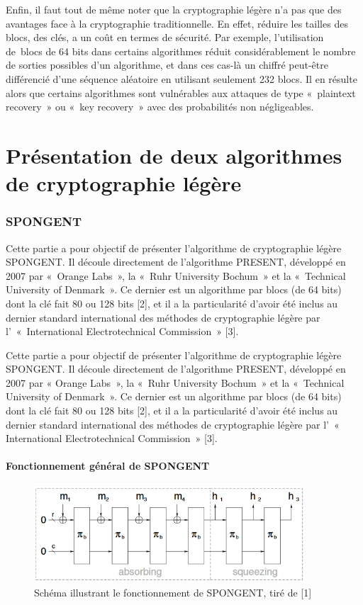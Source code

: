 	Enfin, il faut tout de même noter que la cryptographie légère n’a pas que des
	avantages face à la cryptographie traditionnelle. En effet, réduire les
	tailles des blocs, des clés, a un coût en termes de sécurité. Par exemple,
	l’utilisation de blocs de 64 bits dans certains algorithmes réduit
	considérablement le nombre de sorties possibles d’un algorithme, et dans ces
	cas-là un chiffré peut-être différencié d’une séquence aléatoire en utilisant
	seulement 232 blocs. Il en résulte alors que certains algorithmes sont
	vulnérables aux attaques de type « plaintext recovery » ou « key recovery »
	avec des probabilités non négligeables.


\part{Présentation de deux algorithmes de cryptographie légère}

	\section{SPONGENT}

			Cette partie a pour objectif de présenter l’algorithme de cryptographie légère SPONGENT.
		Il découle directement de l’algorithme PRESENT, développé en 2007 par « Orange Labs », la « Ruhr University Bochum » et la « Technical  University of Denmark ».
		Ce dernier est un algorithme par blocs (de 64 bits) dont la clé fait 80 ou 128 bits [2],
		et il a la particularité d’avoir été inclus au dernier standard international des méthodes de cryptographie légère par l’ « International Electrotechnical Commission » [3].

			Cette partie a pour objectif de présenter l’algorithme de cryptographie légère
		SPONGENT. Il découle directement de l’algorithme PRESENT, développé en 2007 par «
		Orange Labs », la « Ruhr University Bochum » et la « Technical  University of
		Denmark ». Ce dernier est un algorithme par blocs (de 64 bits) dont la clé fait
		80 ou 128 bits [2], et il a la particularité d’avoir été inclus au dernier
		standard international des méthodes de cryptographie légère par l’ «
		International Electrotechnical Commission » [3].

		\subsection{Fonctionnement général de SPONGENT}

		\begin{figure}[!h]
			 	\centering
			 	\includegraphics[width=0.9\textwidth]{imgs/Spongent/fctGlobalSpongent.png}
			 	\caption{Schéma illustrant le fonctionnement de SPONGENT, tiré de [1]}
			 	\label{fctGlobalSpongent}
		\end{figure}

